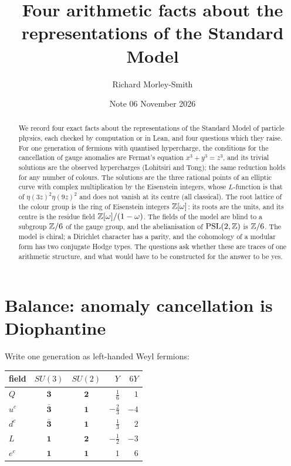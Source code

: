 \documentclass[11pt]{article}
\title{Four arithmetic facts about the representations of the Standard Model}
\author{Richard Morley-Smith}
\date{Note 06 \quad November 2026}
\begin{document}
\maketitle

\begin{abstract}
\noindent
We record four exact facts about the representations of the Standard Model of particle physics, each checked by computation or in Lean, and four questions which they raise.
For one generation of fermions with quantised hypercharge, the conditions for the cancellation of gauge anomalies are Fermat's equation $x^3+y^3=z^3$, and its trivial solutions are the observed hypercharges (Lohitsiri and Tong); the same reduction holds for any number of colours. The solutions are the three rational points of an elliptic curve with complex multiplication by the Eisenstein integers, whose $L$-function is that of $\eta(3z)^2\eta(9z)^2$ and does not vanish at its centre (all classical).
The root lattice of the colour group is the ring of Eisenstein integers $\mathbb{Z}[\omega]$: its roots are the units, and its centre is the residue field $\mathbb{Z}[\omega]/(1-\omega)$.
The fields of the model are blind to a subgroup $\mathbb{Z}/6$ of the gauge group, and the abelianisation of $\mathrm{PSL}(2,\mathbb{Z})$ is $\mathbb{Z}/6$.
The model is chiral; a Dirichlet character has a parity, and the cohomology of a modular form has two conjugate Hodge types.
The questions ask whether these are traces of one arithmetic structure, and what would have to be constructed for the answer to be yes.
\end{abstract}

\section{Balance: anomaly cancellation is Diophantine}\label{sec:balance}

Write one generation as left-handed Weyl fermions:

\begin{center}
\begin{tabular}{@{}lccrr@{}}
\toprule
field & $SU(3)$ & $SU(2)$ & $Y$ & $6Y$\\
\midrule
$Q$ & $\mathbf 3$ & $\mathbf 2$ & $\tfrac16$ & $1$\\
$u^c$ & $\bar{\mathbf 3}$ & $\mathbf 1$ & $-\tfrac23$ & $-4$\\
$d^c$ & $\bar{\mathbf 3}$ & $\mathbf 1$ & $\tfrac13$ & $2$\\
$L$ & $\mathbf 1$ & $\mathbf 2$ & $-\tfrac12$ & $-3$\\
$e^c$ & $\mathbf 1$ & $\mathbf 1$ & $1$ & $6$\\
\bottomrule
\end{tabular}
\end{center}
\end{document}
